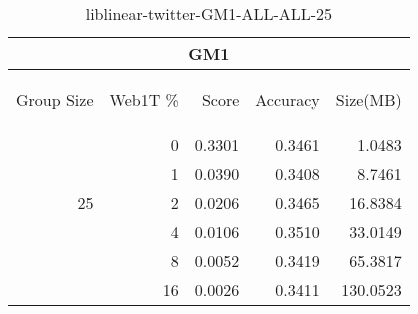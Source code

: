 \begin{center}
\begin{table}[htbp] 
 \begin{center}
\begin{tabular}{ | r | r | r | r | r |}
\hline
\multicolumn{5}{|c|}{GM1}\\
\hline
\begin{sideways}Group Size\end{sideways} & \begin{sideways}Web1T \%\end{sideways} & \begin{sideways}Score\end{sideways} & \begin{sideways}Accuracy\end{sideways} & \begin{sideways}Size(MB)\end{sideways}\\
\hline
\multirow{5}{*}{25}
 & 0 & 0.3301 & 0.3461 & 1.0483\\ \cline{2-5}
 & 1 & 0.0390 & 0.3408 & 8.7461\\ \cline{2-5}
 & 2 & 0.0206 & 0.3465 & 16.8384\\ \cline{2-5}
 & 4 & 0.0106 & 0.3510 & 33.0149\\ \cline{2-5}
 & 8 & 0.0052 & 0.3419 & 65.3817\\ \cline{2-5}
 & 16 & 0.0026 & 0.3411 & 130.0523\\ \cline{2-5}
\hline
\end{tabular}
\caption{liblinear-twitter-GM1-ALL-ALL-25}
\label{table:liblinear-twitter-GM1-ALL-ALL-25}
\end{center}
 \end{table}
\end{center}

